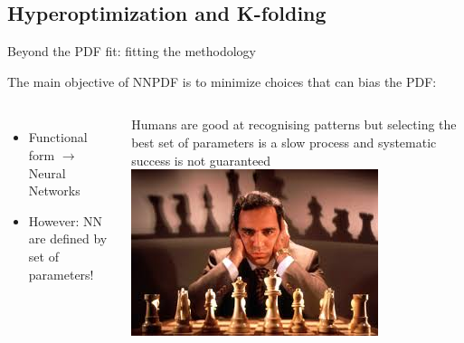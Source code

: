 \newcommand{\gct}{\color{darkgreen}\checkmark}
\newcommand{\rma}{\color{red}\ding{55}}
\newcommand{\bct}{\color{blue}\checkmark}

\author[Juan Cruz-Martinez]{}

\subsection{Hyperoptimization and K-folding}

\begin{frame}{Beyond the PDF fit: fitting the methodology}

    The main objective of NNPDF is to minimize choices that can bias the PDF:

    \begin{columns}
        \begin{itemize}
            \item[\rma] Functional form $\longrightarrow$ Neural Networks
            \item[\rma] However: NN are defined by set of parameters!
        \end{itemize}

        \vspace{0.2cm}

        Humans are good at recognising patterns but selecting the best
        set of parameters is a slow process and systematic success is not guaranteed
        \includegraphics[width=\textwidth]{juan_future_hyperopt/kasparov.jpg}


\end{columns}
\end{frame}
